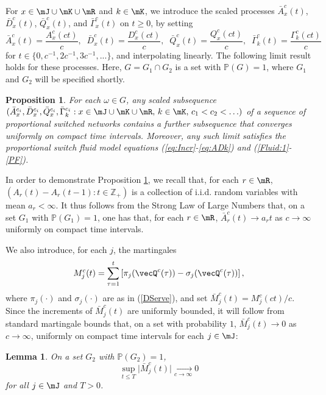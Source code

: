 \documentclass{amsart}
\newtheorem{lemma}{Lemma}
\newtheorem{proposition}{Proposition}
\begin{document}
For $x\in \mJ \cup \mK \cup \mR$ and $k\in\mK$, we introduce the 
scaled processes $\bar{A}^c_x(t)$, $\bar{D}^c_x(t)$, $\bar{Q}^c_x(t)$, and $\bar{\Gamma}^c_x(t)$
on $t\ge 0$, by setting
\begin{equation}\label{eq:fluid.scaled.processes}
\bar{A}^c_x(t) = \frac{A_x^c( ct )}{c},\;\;\bar{D}^c_x(t) = \frac{D_x^c(ct)}{c},\;\;\bar{Q}^c_x(t) = \frac{Q_x^c(ct)}{c},\;\; \bar{\Gamma}^c_k(t) = \frac{\Gamma^c_k(ct)}{c}  
\end{equation}
for $t\in\{0,c^{-1},2c^{-1}, 3c^{-1},...\}$, and interpolating linearly.
The following limit result holds for these processes. 
Here, $G = G_1 \cap G_2$ is a set with $\mathbb{P}(G) = 1$, where $G_1$ and $G_2$ will be specified shortly.
\begin{proposition}\label{FluidLimit}
For each $\omega \in G$, any scaled subsequence  $ (\bar{A}^{c_i}_x, \bar{D}^{c_i}_x,\bar{Q}^{c_i}_x,\bar{\Gamma}_k^{c_i} : x\in \mJ \cup\mK \cup \mR, \,k\in\mK,\,c_1 < c_2 < \ldots)$ of a sequence of proportional switched networks contains a further subsequence that converges uniformly on compact time intervals. Moreover, any such limit satisfies the proportional switch fluid model equations (\ref{eq:Incr}-\ref{eq:ADk}) and (\ref{Fluid:1}-\ref{PF}). 
\end{proposition}

In order to demonstrate Proposition \ref{FluidLimit}, we recall that, for each $r\in \mR$,  $(A_r(t)-A_r(t-1): t\in \mathbb{Z}_+)$ is a collection of i.i.d. random variables with  
mean $a_r < \infty$. It thus follows from
the Strong Law of Large Numbers that, on a set $G_1$ with $\mathbb{P}(G_1) = 1$, 
one has that, for each $r\in\mR$,  
$\bar{A}^c_r(t)\to a_r t$ as $c\to \infty$
uniformly on compact time intervals. 

We also introduce, for each $j$, the martingales
\[
M_j^c(t) = \sum_{\tau=1}^t \left[ \pi_j({\vecQ}^{c}(\tau)) - \sigma_j({\vecQ}^{c}(\tau)) \right] ,
\]
 where $\pi_j(\cdot)$ and $\sigma_j(\cdot)$  are as in (\ref{DServe}), and set
$\bar{M}^c_j(t) = M^c_j(ct)/c$.
Since the increments of $\bar{M}^c_j(t)$ are uniformly bounded, it will follow from standard 
martingale bounds that, on a set with probability $1$, $\bar{M}_j^c(t) \to 0$ as $c\to \infty$, uniformly on compact time intervals for each $j\in\mJ$:

\begin{lemma} 
\label{lastlemma}
On a set $G_2$ with $\mathbb{P}(G_2) = 1$,
\[
\sup_{t\leq T} \Big|\bar{M}_j^c(t)  \Big|\xrightarrow[c\rightarrow \infty]{} 0
\]
 for all $j\in\mJ$ and $T>0$.
\end{lemma}
\end{document}
